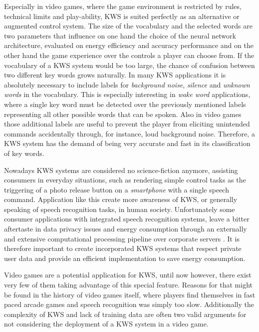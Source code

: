 Especially in video games, where the game environment is restricted by rules, technical limits and play-ability, KWS is suited perfectly as an alternative or augmented control system.
The size of the vocabulary and the selected words are two parameters that influence on one hand the choice of the neural network architecture, evaluated on energy efficiency and accuracy performance and on the other hand the game experience over the controls a player can choose from.
If the vocabulary of a KWS system would be too large, the chance of confusion between two different key words grows naturally.
In many KWS applications it is absolutely necessary to include labels for \emph{background noise}, \emph{silence} and \emph{unknown words} in the vocabulary. 
This is especially interesting in \emph{wake word} applications, where a single key word must be detected over the previously mentioned labels representing all other possible words that can be spoken.
Also in video games those additional labels are useful to prevent the player from eliciting unintended commands accidentally through, for instance, loud background noise.
Therefore, a KWS system has the demand of being very accurate and fast in its classification of key words.

Nowadays KWS systems are considered no science-fiction anymore, assisting consumers in everyday situations, such as rendering simple control tasks as the triggering of a photo release button on a \emph{smartphone} with a single speech command.
Application like this create more awareness of KWS, or generally speaking of speech recognition tasks, in human society.
Unfortunately some consumer applications with integrated speech recognition systems, leave a bitter aftertaste in data privacy issues and energy consumption through an externally and extensive computational processing pipeline over corporate servers \cite{Tang2018}.
It is therefore important to create incorporated KWS systems that respect private user data and provide an efficient implementation to save energy consumption.

Video games are a potential application for KWS, until now however, there exist very few of them taking advantage of this special feature.
Reasons for that might be found in the history of video games itself, where players find themselves in fast paced arcade games and speech recognition was simply too slow.
Additionally the complexity of KWS and lack of training data are often two valid arguments for not considering the deployment of a KWS system in a video game.


